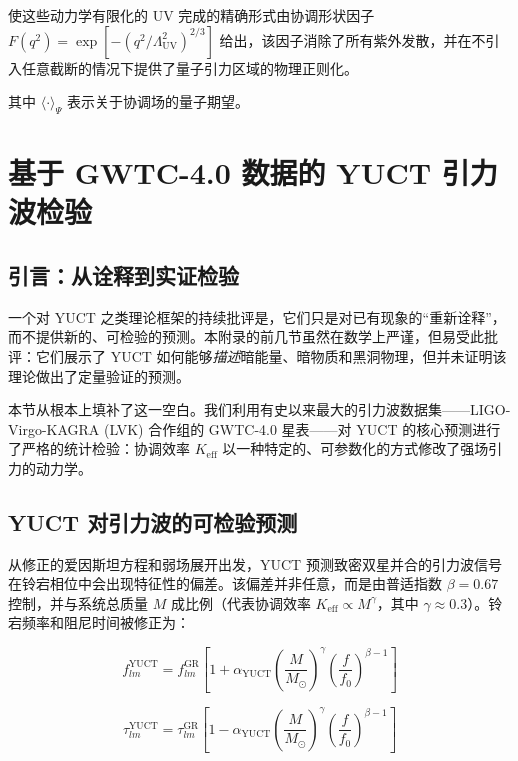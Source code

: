 \documentclass[11pt,a4paper]{article}
\theoremstyle{remark}
\newcommand{\Keff}{K_{\mathrm{eff}}}
\begin{document}
	使这些动力学有限化的 UV 完成的精确形式由协调形状因子 $F(q^2)=\exp[-(q^2/\Lambda_{\mathrm{UV}}^2)^{2/3}]$ 给出，该因子消除了所有紫外发散，并在不引入任意截断的情况下提供了量子引力区域的物理正则化。
	
	其中 $\langle \cdot \rangle_{\Psi}$ 表示关于协调场的量子期望。
	
	\section{基于 GWTC-4.0 数据的 YUCT 引力波检验}
	\label{sec:gw-tests}
	
	\subsection{引言：从诠释到实证检验}
	
	一个对 YUCT 之类理论框架的持续批评是，它们只是对已有现象的“重新诠释”，而不提供新的、可检验的预测。本附录的前几节虽然在数学上严谨，但易受此批评：它们展示了 YUCT 如何能够\textit{描述}暗能量、暗物质和黑洞物理，但并未证明该理论做出了定量验证的预测。
	
	本节从根本上填补了这一空白。我们利用有史以来最大的引力波数据集——LIGO-Virgo-KAGRA (LVK) 合作组的 GWTC-4.0 星表——对 YUCT 的核心预测进行了严格的统计检验：协调效率 $\Keff$ 以一种特定的、可参数化的方式修改了强场引力的动力学。
	
	\subsection{YUCT 对引力波的可检验预测}
	
	从修正的爱因斯坦方程和弱场展开出发，YUCT 预测致密双星并合的引力波信号在铃宕相位中会出现特征性的偏差。该偏差并非任意，而是由普适指数 $\beta = 0.67$ 控制，并与系统总质量 $M$ 成比例（代表协调效率 $\Keff \propto M^{\gamma}$，其中 $\gamma \approx 0.3$）。铃宕频率和阻尼时间被修正为：
	
	\begin{equation}
		f_{lm}^{\text{YUCT}} = f_{lm}^{\text{GR}} \left[ 1 + \alpha_{\text{YUCT}} \left( \frac{M}{M_\odot} \right)^{\gamma} \left( \frac{f}{f_0} \right)^{\beta-1} \right]
		\label{eq:freq-mod}
	\end{equation}
	
	\begin{equation}
		\tau_{lm}^{\text{YUCT}} = \tau_{lm}^{\text{GR}} \left[ 1 - \alpha_{\text{YUCT}} \left( \frac{M}{M_\odot} \right)^{\gamma} \left( \frac{f}{f_0} \right)^{\beta-1} \right]
		\label{eq:tau-mod}
	\end{equation}
	
\end{document}
